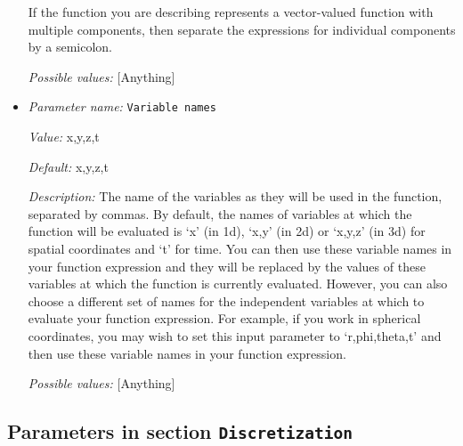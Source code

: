 \begin{itemize}
If the function you are describing represents a vector-valued function with multiple components, then separate the expressions for individual components by a semicolon.


{\it Possible values:} [Anything]
\item {\it Parameter name:} {\tt Variable names}
\label{parameters:Compositional initial conditions/Function/Variable names}


{\it Value:} x,y,z,t


{\it Default:} x,y,z,t


{\it Description:} The name of the variables as they will be used in the function, separated by commas. By default, the names of variables at which the function will be evaluated is `x' (in 1d), `x,y' (in 2d) or `x,y,z' (in 3d) for spatial coordinates and `t' for time. You can then use these variable names in your function expression and they will be replaced by the values of these variables at which the function is currently evaluated. However, you can also choose a different set of names for the independent variables at which to evaluate your function expression. For example, if you work in spherical coordinates, you may wish to set this input parameter to `r,phi,theta,t' and then use these variable names in your function expression.


{\it Possible values:} [Anything]
\end{itemize}

\subsection{Parameters in section \tt Discretization}
\label{parameters:Discretization}

